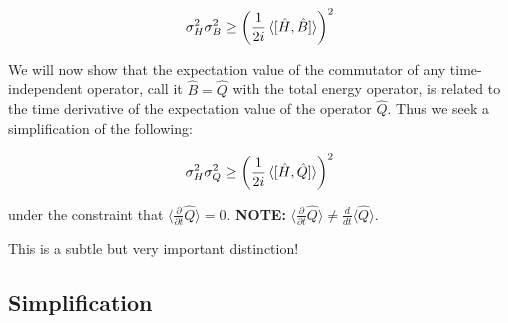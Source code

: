 \documentclass{article}
\begin{document}
$$\sigma_H^2 \sigma_B^2 \geq \left( \frac{1}{2i} \braket{[\hat{H}, \hat{B}]} \right)^2$$

We will now show that the expectation value of the commutator of any time-independent operator, call it $\hat{B} = \hat{Q}$  with the total energy operator, is related to the time derivative of the expectation value of the operator $\hat{Q}$. Thus we seek a simplification of the following:

$$\sigma_H^2 \sigma_Q^2 \geq \left( \frac{1}{2i} \braket{[\hat{H}, \hat{Q}]} \right)^2$$

under the constraint that $\langle \frac{\partial}{\partial t} \hat{Q} \rangle = 0$. \textbf{NOTE:} $\langle \frac{\partial}{\partial t} \hat{Q} \rangle \neq \frac{d}{dt} \langle \hat{Q} \rangle$. 

This is a subtle but very important distinction!

\subsection{Simplification}
\end{document}
